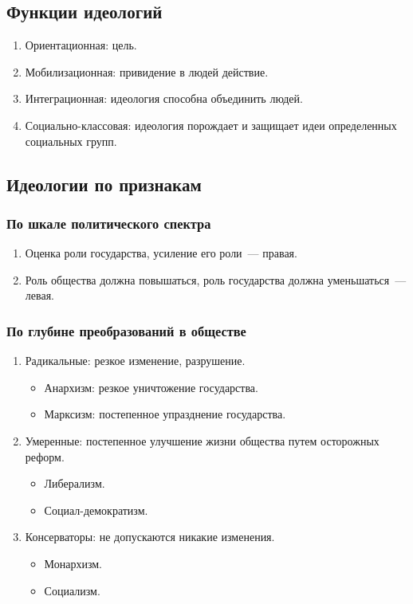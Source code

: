 \documentclass[12pt]{article}
\begin{document}
	\subsection{Функции идеологий}
	\begin{enumerate}
		\item Ориентационная: цель.
		\item Мобилизационная: привидение в людей действие.
		\item Интеграционная: идеология способна объединить людей.
		\item Социально-классовая: идеология порождает и защищает идеи определенных социальных групп.
	\end{enumerate}
	\subsection{Идеологии по признакам}
	\subsubsection{По шкале политического спектра}
	\begin{enumerate}
		\item Оценка роли государства, усиление его роли~--- правая.
		\item Роль общества должна повышаться, роль государства должна уменьшаться~--- левая.
	\end{enumerate}
	\subsubsection{По глубине преобразований в обществе}
	\begin{enumerate}
		\item Радикальные: резкое изменение, разрушение.
		\begin{itemize}
			\item Анархизм: резкое уничтожение государства.
			\item Марксизм: постепенное упразднение государства.
		\end{itemize}
		\item Умеренные: постепенное улучшение жизни общества путем осторожных реформ.
		\begin{itemize}
			\item Либерализм.
			\item Социал-демократизм.
		\end{itemize}
		\item Консерваторы: не допускаются никакие изменения.
		\begin{itemize}
			\item Монархизм.
			\item Социализм.
		\end{itemize}
	\end{enumerate}
\end{document}
